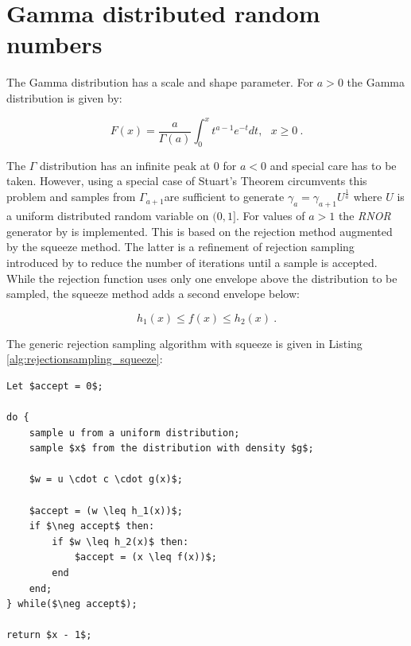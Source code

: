 \documentclass[a4paper]{scrartcl}
\begin{document}
\section*{Gamma distributed random numbers}

The Gamma distribution has a scale and shape parameter. For $a > 0$ the Gamma distribution is given by:

\begin{equation*}
F(x) = \frac{a}{\Gamma(a)} \int_{0}^{x} t^{a-1} e^{-t} dt, ~~~x \geq 0~.
\end{equation*}

The $\Gamma$ distribution has an infinite peak at $0$ for $a < 0$ and special care has to be taken. However, using a special case of Stuart's Theorem circumvents this problem and samples from $\Gamma_{a + 1}$are sufficient to generate $\gamma_a = \gamma_{a + 1} U^{\frac{1}{a}}$ where $U$ is a uniform distributed random variable on $(0, 1]$. For values of $a > 1$ the {\it RNOR} generator by \citet{Marsaglia2000} is implemented.
%
%
%
%
This is based on the rejection method augmented by the squeeze method. The latter is a refinement of rejection sampling introduced by \citet{Marsaglia1977} to reduce the number of iterations until a sample is accepted. While the rejection function uses only one envelope above the distribution to be sampled, the squeeze method adds a second envelope below:

\begin{equation*}
h_1(x) \leq f(x) \leq h_2(x)~.
\end{equation*}

The generic rejection sampling algorithm with squeeze is given in Listing \ref{alg:rejectionsampling_squeeze}:\vspace{10mm}


{
\begin{lstlisting}[caption={Rejection-sampling with squeeze\,\citep{Devroye1980}.}, label=alg:rejectionsampling_squeeze]
Let $accept = 0$;

do {
    sample u from a uniform distribution;
    sample $x$ from the distribution with density $g$;
    
    $w = u \cdot c \cdot g(x)$;
    
    $accept = (w \leq h_1(x))$;
    if $\neg accept$ then:
        if $w \leq h_2(x)$ then:
            $accept = (x \leq f(x))$;
        end
    end;    
} while($\neg accept$);

return $x - 1$;
\end{lstlisting}
}
\end{document}

